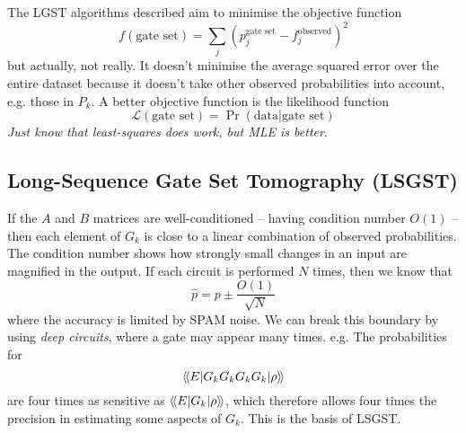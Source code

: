 \vspace{1em}

\noindent The LGST algorithms described aim to minimise the objective function
\begin{equation}
    f(\text{gate set}) = \sum_j \left(p_j^{\text{gate set}} - f_j^{\text{observed}}\right)^2
\end{equation}
but actually, not really. It doesn't minimise the average squared error over the entire dataset
because it doesn't take other observed probabilities into account, e.g. those in $P_k$. A better
objective function is the likelihood function
\begin{equation}
    \mathcal{L}(\text{gate set}) = \Pr (\text{data} | \text{gate set})
\end{equation}
\textit{Just know that least-squares does work, but MLE is better}.

\subsection{Long-Sequence Gate Set Tomography (LSGST)}

If the $A$ and $B$ matrices are well-conditioned -- having condition number $O(1)$ -- then each
element of $G_k$ is close to a linear combination of observed probabilities. The condition number
shows how strongly small changes in an input are magnified in the output. If each circuit is
performed $N$ times, then we know that
\begin{equation}
    \hat{p} = p \pm \frac{O(1)}{\sqrt{N}}
\end{equation}
where the accuracy is limited by SPAM noise. We can break this boundary by using \textit{deep
circuits}, where a gate may appear many times. e.g. The probabilities for
\begin{equation}
    \langle\!\braket{E | G_k G_k G_k G_k | \rho}\!\rangle
\end{equation}
are four times as sensitive as $\langle\!\braket{E | G_k | \rho}\!\rangle$, which therefore allows four times the
precision in estimating some aspects of $G_k$. This is the basis of \ac{LSGST}.

